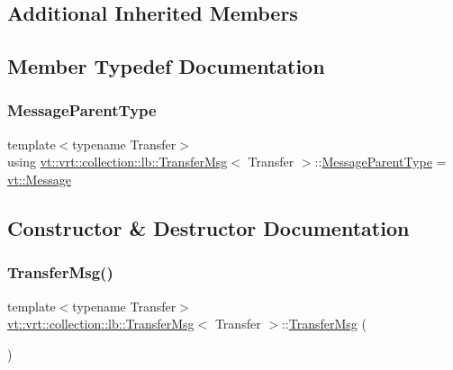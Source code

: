 \subsection*{Additional Inherited Members}


\subsection{Member Typedef Documentation}
\mbox{\label{structvt_1_1vrt_1_1collection_1_1lb_1_1_transfer_msg_a7bbde6f5de84e4616188963323d473ca}} 
\subsubsection{\texorpdfstring{Message\+Parent\+Type}{MessageParentType}}
{\footnotesize\ttfamily template$<$typename Transfer$>$ \\
using \hyperlink{structvt_1_1vrt_1_1collection_1_1lb_1_1_transfer_msg}{vt\+::vrt\+::collection\+::lb\+::\+Transfer\+Msg}$<$ Transfer $>$\+::\hyperlink{structvt_1_1messaging_1_1_active_msg_ac2e6d93267991027ce78c968b17064c7}{Message\+Parent\+Type} =  \hyperlink{namespacevt_a3a3ddfef40b4c90915fa43cdd5f129ea}{vt\+::\+Message}}



\subsection{Constructor \& Destructor Documentation}
\mbox{\label{structvt_1_1vrt_1_1collection_1_1lb_1_1_transfer_msg_ad94fef4d81e901de07019aa41718c516}} 
\subsubsection{\texorpdfstring{Transfer\+Msg()}{TransferMsg()}\hspace{0.1cm}{\footnotesize\ttfamily [1/2]}}
{\footnotesize\ttfamily template$<$typename Transfer$>$ \\
\hyperlink{structvt_1_1vrt_1_1collection_1_1lb_1_1_transfer_msg}{vt\+::vrt\+::collection\+::lb\+::\+Transfer\+Msg}$<$ Transfer $>$\+::\hyperlink{structvt_1_1vrt_1_1collection_1_1lb_1_1_transfer_msg}{Transfer\+Msg} (\begin{DoxyParamCaption}{ }\end{DoxyParamCaption})\hspace{0.3cm}{\ttfamily [default]}}

